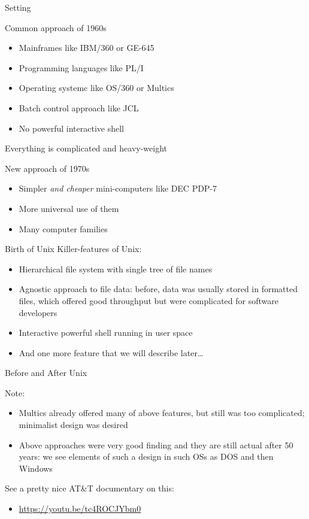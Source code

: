 \documentclass[xetex,aspectratio=149]{beamer}
\begin{document}
\begin{frame}{Setting}
	\begin{block}{Common approach of 1960s}
		\begin{itemize}
			\item Mainframes like IBM/360 or GE-645
			\item Programming languages like PL/I
			\item Operating systemc like OS/360 or Multics
			\item Batch control approach like JCL
			\item No powerful interactive shell
		\end{itemize}
		Everything is complicated and heavy-weight
	\end{block}
\pause
	\begin{block}{New approach of 1970s}
	\begin{itemize}
		\item Simpler \emph{and cheaper} mini-computers like DEC PDP-7
		\item More universal use of them
		\item Many computer families
	\end{itemize}
\end{block}
\end{frame}

\begin{frame}{Birth of Unix}
Killer-features of Unix:

\begin{itemize}
	\item Hierarchical file system with single tree of file names
	\item Agnostic approach to file data: before, data was usually stored in formatted files, which offered good throughput but were complicated for software developers
	\item Interactive powerful shell running in user space
	\pause
	\item And one more feature that we will describe later\ldots
\end{itemize}

\end{frame}

\begin{frame}{Before and After Unix}

Note:

\begin{itemize}
	\item Multics already offered many of above features, but still was too complicated; minimalist design was desired
	\item Above approaches were very good finding and they are still actual after 50 years: we see elements of such a design in such OSs as DOS and then Windows
\end{itemize}

See a pretty nice AT\&T documentary on this:
\begin{itemize}
	\item \url{https://youtu.be/tc4ROCJYbm0}
\end{itemize}

\end{frame}
\end{document}
